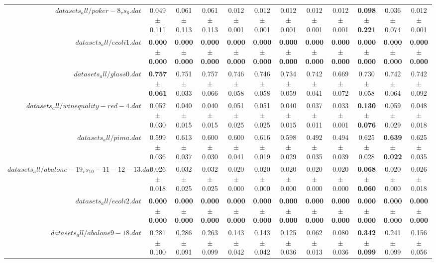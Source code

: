\begin{table}[!ht]
{\begin{tabular}{r c c c c c c c c c c c}
$datasets_all/poker-8_vs_6.dat$ & 0.049 $\pm$ 0.111 & 0.061 $\pm$ 0.113 & 0.061 $\pm$ 0.113 & 0.012 $\pm$ 0.001 & 0.012 $\pm$ 0.001 & 0.012 $\pm$ 0.001 & 0.012 $\pm$ 0.001 & 0.012 $\pm$ 0.001 & \textbf{0.098 $\pm$ 0.221} & 0.036 $\pm$ 0.074 & 0.012 $\pm$ 0.001 \\
$datasets_all/ecoli1.dat$ & \textbf{0.000 $\pm$ 0.000} & \textbf{0.000 $\pm$ 0.000} & \textbf{0.000 $\pm$ 0.000} & \textbf{0.000 $\pm$ 0.000} & \textbf{0.000 $\pm$ 0.000} & \textbf{0.000 $\pm$ 0.000} & \textbf{0.000 $\pm$ 0.000} & \textbf{0.000 $\pm$ 0.000} & \textbf{0.000 $\pm$ 0.000} & \textbf{0.000 $\pm$ 0.000} & \textbf{0.000 $\pm$ 0.000} \\
$datasets_all/glass0.dat$ & \textbf{0.757 $\pm$ 0.061} & 0.751 $\pm$ 0.033 & 0.757 $\pm$ 0.066 & 0.746 $\pm$ 0.058 & 0.746 $\pm$ 0.058 & 0.734 $\pm$ 0.059 & 0.742 $\pm$ 0.041 & 0.669 $\pm$ 0.072 & 0.730 $\pm$ 0.058 & 0.742 $\pm$ 0.064 & 0.742 $\pm$ 0.092 \\
$datasets_all/winequality-red-4.dat$ & 0.052 $\pm$ 0.030 & 0.040 $\pm$ 0.015 & 0.040 $\pm$ 0.015 & 0.051 $\pm$ 0.025 & 0.051 $\pm$ 0.025 & 0.040 $\pm$ 0.015 & 0.037 $\pm$ 0.011 & 0.033 $\pm$ 0.001 & \textbf{0.130 $\pm$ 0.076} & 0.059 $\pm$ 0.029 & 0.048 $\pm$ 0.018 \\
$datasets_all/pima.dat$ & 0.599 $\pm$ 0.036 & 0.613 $\pm$ 0.037 & 0.600 $\pm$ 0.030 & 0.600 $\pm$ 0.041 & 0.616 $\pm$ 0.019 & 0.598 $\pm$ 0.029 & 0.492 $\pm$ 0.035 & 0.494 $\pm$ 0.039 & 0.625 $\pm$ 0.028 & \textbf{0.639 $\pm$ 0.022} & 0.625 $\pm$ 0.035 \\
$datasets_all/abalone-19_vs_10-11-12-13.dat$ & 0.026 $\pm$ 0.018 & 0.032 $\pm$ 0.025 & 0.032 $\pm$ 0.025 & 0.020 $\pm$ 0.000 & 0.020 $\pm$ 0.000 & 0.020 $\pm$ 0.000 & 0.020 $\pm$ 0.000 & 0.020 $\pm$ 0.000 & \textbf{0.068 $\pm$ 0.060} & 0.020 $\pm$ 0.000 & 0.026 $\pm$ 0.018 \\
$datasets_all/ecoli2.dat$ & \textbf{0.000 $\pm$ 0.000} & \textbf{0.000 $\pm$ 0.000} & \textbf{0.000 $\pm$ 0.000} & \textbf{0.000 $\pm$ 0.000} & \textbf{0.000 $\pm$ 0.000} & \textbf{0.000 $\pm$ 0.000} & \textbf{0.000 $\pm$ 0.000} & \textbf{0.000 $\pm$ 0.000} & \textbf{0.000 $\pm$ 0.000} & \textbf{0.000 $\pm$ 0.000} & \textbf{0.000 $\pm$ 0.000} \\
$datasets_all/abalone9-18.dat$ & 0.281 $\pm$ 0.100 & 0.286 $\pm$ 0.091 & 0.263 $\pm$ 0.099 & 0.143 $\pm$ 0.042 & 0.143 $\pm$ 0.042 & 0.125 $\pm$ 0.036 & 0.062 $\pm$ 0.013 & 0.080 $\pm$ 0.036 & \textbf{0.342 $\pm$ 0.099} & 0.241 $\pm$ 0.099 & 0.156 $\pm$ 0.056 \\

\end{tabular}}
\end{table}
